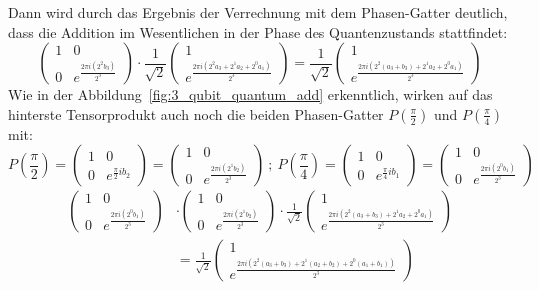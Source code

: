 Dann wird durch das Ergebnis der Verrechnung mit dem Phasen-Gatter deutlich, 
dass die Addition im Wesentlichen in der Phase des Quantenzustands stattfindet:
\[\begin{pmatrix}
    1 & 0 \\
    0 & e^{\frac{2\pi i (2^2b_3)}{2^3}}
  \end{pmatrix}
    \cdot
\frac{1}{\sqrt{2}}
\begin{pmatrix}
    1  \\
     e^{\frac{2 \pi i (2^{2}a_3 +2^1a_2+2^0a_1)}{2^3}}
  \end{pmatrix}
  =
  \frac{1}{\sqrt{2}}
  \begin{pmatrix}
    1  \\
     e^{\frac{2 \pi i (2^{2}(a_3+b_3) +2^1a_2+2^0a_1)}{2^3}}
  \end{pmatrix}
\]
Wie in der Abbildung~\ref{fig:3_qubit_quantum_add} erkenntlich,
wirken auf das hinterste Tensorprodukt auch noch die beiden Phasen-Gatter \(P(\frac{\pi}{2})\) und \(P(\frac{\pi}{4})\) mit:
\[
    P(\frac{\pi}{2}) = 
\begin{pmatrix}
    1 & 0 \\
    0 & e^{\frac{\pi}{2} i b_2}
  \end{pmatrix}
  =
  \begin{pmatrix}
    1 & 0 \\
    0 & e^{\frac{2\pi i (2^1b_2)}{2^3}}
  \end{pmatrix}
  ~;~
P(\frac{\pi}{4}) = 
\begin{pmatrix}
    1 & 0 \\
    0 & e^{\frac{\pi}{4} i b_1}
  \end{pmatrix}
  =
  \begin{pmatrix}
    1 & 0 \\
    0 & e^{\frac{2\pi i (2^0b_1)}{2^3}}
  \end{pmatrix}
\]
\begin{align*}
    \begin{pmatrix}
        1 & 0 \\
        0 & e^{\frac{2\pi i (2^0b_1)}{2^3}}
      \end{pmatrix}
      &\cdot
      \begin{pmatrix}
        1 & 0 \\
        0 & e^{\frac{2\pi i (2^1b_2)}{2^3}}
      \end{pmatrix}
      \cdot
      \frac{1}{\sqrt{2}}
      \begin{pmatrix}
        1  \\
         e^{\frac{2 \pi i (2^{2}(a_3+b_3) +2^1a_2+2^0a_1)}{2^3}} 
      \end{pmatrix} 
     \\
      &=
      \frac{1}{\sqrt{2}}
      \begin{pmatrix}
        1  \\
         e^{\frac{2 \pi i (2^{2}(a_3+b_3) +2^1(a_2+b_2)+2^0(a_1+b_1))}{2^3}}
      \end{pmatrix}
\end{align*}
